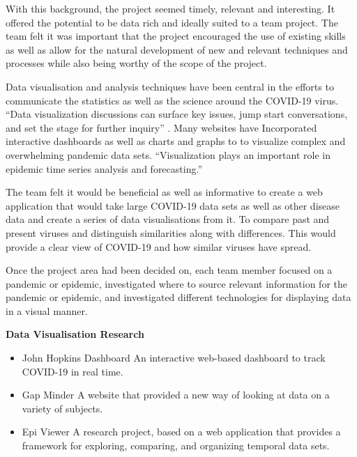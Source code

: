 \vspace{5mm}







With this background, the project seemed timely, relevant and interesting.
It offered the potential to be data rich and ideally suited to a team project. The team felt it was important that the project encouraged the use of existing skills as well as allow for the natural development of new and relevant techniques and processes while also being worthy of the scope of the project.

\vspace{5mm} %

Data visualisation and analysis techniques have been central in the efforts to communicate the statistics as well as the science around the COVID-19 virus. 
“Data visualization discussions can surface key issues, jump start conversations, and set the stage for further inquiry” \cite{fontichiaro2021using}. Many websites have Incorporated interactive dashboards as well as charts and graphs to to visualize complex and overwhelming pandemic data sets. 
“Visualization plays an important role in epidemic time series analysis and forecasting.”\cite{thorve2018epiviewer}

\vspace{5mm} %

The team felt it would be beneficial as well as informative to create a web application that would take large COVID-19 data sets as well as other disease data and create a series of data visualisations from it. To compare past and present viruses and distinguish similarities along with differences. This would provide a clear view of COVID-19 and how similar viruses have spread.

\vspace{3mm} %
Once the project area had been decided on, each team member focused on a pandemic or epidemic, investigated where to source relevant information for the pandemic or epidemic, and investigated different technologies for displaying data in a visual manner.

\vspace{5mm}

\textbf{Data Visualisation Research}
\begin{itemize}
    \item John Hopkins Dashboard
            An interactive web-based dashboard to track COVID-19 in real time.
    \item Gap Minder
            A website that provided a new way of looking at data on a variety of subjects.
    \item Epi Viewer
            A research project, based on a web application that provides a framework for exploring, comparing, and organizing temporal data sets.
    
\end{itemize}

